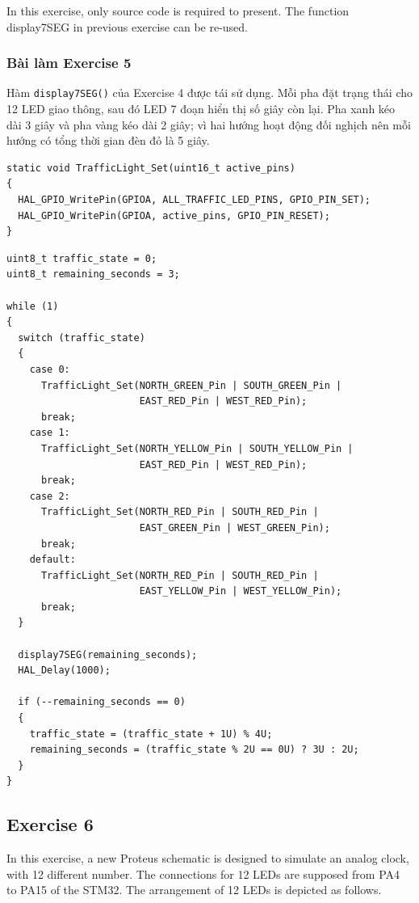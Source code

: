 In this exercise, only source code is required to present. The function display7SEG in previous exercise can be re-used.

\subsubsection*{Bài làm Exercise 5}

Hàm \texttt{display7SEG()} của Exercise 4 được tái sử dụng. Mỗi pha đặt trạng
thái cho 12 LED giao thông, sau đó LED 7 đoạn hiển thị số giây còn lại. Pha xanh
kéo dài 3 giây và pha vàng kéo dài 2 giây; vì hai hướng hoạt động đối nghịch nên
mỗi hướng có tổng thời gian đèn đỏ là 5 giây.

\begin{lstlisting}[caption=Hàm chọn trạng thái đèn giao thông]
static void TrafficLight_Set(uint16_t active_pins)
{
  HAL_GPIO_WritePin(GPIOA, ALL_TRAFFIC_LED_PINS, GPIO_PIN_SET);
  HAL_GPIO_WritePin(GPIOA, active_pins, GPIO_PIN_RESET);
}
\end{lstlisting}

\begin{lstlisting}[caption=Chu kỳ đèn giao thông bốn hướng có đếm ngược]
uint8_t traffic_state = 0;
uint8_t remaining_seconds = 3;

while (1)
{
  switch (traffic_state)
  {
    case 0:
      TrafficLight_Set(NORTH_GREEN_Pin | SOUTH_GREEN_Pin |
                       EAST_RED_Pin | WEST_RED_Pin);
      break;
    case 1:
      TrafficLight_Set(NORTH_YELLOW_Pin | SOUTH_YELLOW_Pin |
                       EAST_RED_Pin | WEST_RED_Pin);
      break;
    case 2:
      TrafficLight_Set(NORTH_RED_Pin | SOUTH_RED_Pin |
                       EAST_GREEN_Pin | WEST_GREEN_Pin);
      break;
    default:
      TrafficLight_Set(NORTH_RED_Pin | SOUTH_RED_Pin |
                       EAST_YELLOW_Pin | WEST_YELLOW_Pin);
      break;
  }

  display7SEG(remaining_seconds);
  HAL_Delay(1000);

  if (--remaining_seconds == 0)
  {
    traffic_state = (traffic_state + 1U) % 4U;
    remaining_seconds = (traffic_state % 2U == 0U) ? 3U : 2U;
  }
}
\end{lstlisting}

\subsection{Exercise 6}
In this exercise, a new Proteus schematic is designed to simulate an analog clock, with 12 different number. The connections for 12 LEDs are supposed from PA4 to PA15 of the STM32. The arrangement of 12 LEDs is depicted as follows.

